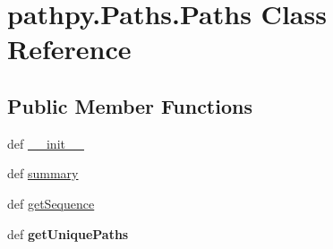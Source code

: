 \hypertarget{classpathpy_1_1Paths_1_1Paths}{\section{pathpy.\-Paths.\-Paths Class Reference}
\label{classpathpy_1_1Paths_1_1Paths}
}
\subsection*{Public Member Functions}
\begin{DoxyCompactItemize}
\item 
def \hyperlink{classpathpy_1_1Paths_1_1Paths_a5e853dc424f2142bc53df219e33be29f}{\-\_\-\-\_\-init\-\_\-\-\_\-}
\item 
def \hyperlink{classpathpy_1_1Paths_1_1Paths_ad519d020de268ea49898e7520be4ffcf}{summary}
\item 
def \hyperlink{classpathpy_1_1Paths_1_1Paths_ab457e7e3f439e193410be707a2cd39bd}{get\-Sequence}
\item 
\hypertarget{classpathpy_1_1Paths_1_1Paths_afc152a2783167b289326e528f0077951}{def {\bfseries get\-Unique\-Paths}}\label{classpathpy_1_1Paths_1_1Paths_afc152a2783167b289326e528f0077951}


\end{DoxyCompactItemize}

